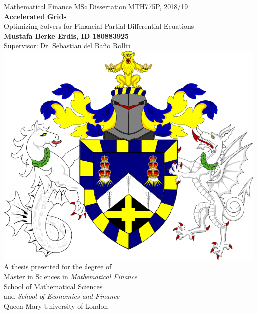 \documentclass[12pt, oneside]{book}
\theoremstyle{plain}
\theoremstyle{definition}
\begin{document}
\begin{titlepage}
\begin{center}
        \vspace{-2cm}
Mathematical Finance MSc Dissertation MTH775P, 2018/19 
		\\
        \Huge
        \textbf{Accelerated Grids}
        \\        
        \vspace{0.4cm}
        \Large
        Optimizing Solvers for Financial Partial Differential Equations
        \\  
        \LARGE     
        \vspace{0.4cm}        
        \textbf{Mustafa Berke Erdis, ID 180883925}%
        \\
        \large Supervisor: Dr. Sebastian del Ba\~{n}o Rollin
        \\
        \vspace{0.9cm}
        \includegraphics[scale=0.23]{QMCrest.png}
        \\
        \vspace{0.9cm}        
        \LARGE 
        A thesis presented for the degree of\\
        Master in Sciences in \emph{Mathematical Finance}\\
        \vspace{0.7cm}        
        \Large
        School of Mathematical Sciences\\ 
        and \emph{School of Economics and Finance}\\
        Queen Mary University of London \\
    \end{center}
\end{titlepage}
\end{document}
